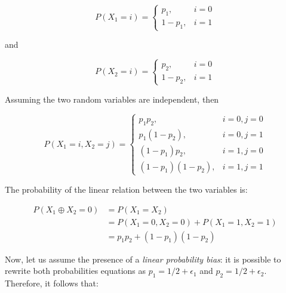             \begin{equation}
                P(X_1 = i) = \left\{\begin{matrix}
                                p_1, & i = 0\\ 
                                1 - p_1, & i = 1 
                             \end{matrix}\right.
            \end{equation}

            \noindent and

            \begin{equation}
                P(X_2 = i) = \left\{\begin{matrix}
                                p_2, & i = 0\\ 
                                1 - p_2, & i = 1 
                             \end{matrix}\right.
            \end{equation}

            \noindent Assuming the two random variables are independent, then

            \begin{equation}
                P(X_1 = i, X_2 = j) = \left\{\begin{matrix}
                                         p_1p_2, & i = 0, j = 0\\ 
                                         p_1(1 - p_2), & i = 0, j = 1\\
                                         (1 - p_1)p_2, & i = 1, j = 0\\
                                         (1 - p_1)(1 - p_2), & i = 1, j = 1
                                      \end{matrix}\right.
            \end{equation}

            \noindent The probability of the linear relation between the two variables is:

            \begin{align*}
                P(X_1 \oplus X_2 = 0)   &= P(X_1 = X_2) \\
                                        &= P(X_1 = 0, X_2 = 0) + P(X_1 = 1, X_2 = 1) \\
                                        &= p_1p_2 + (1-p_1)(1-p_2)
            \end{align*}

            \noindent Now, let us assume the presence of a \emph{linear probability bias}: it is possible to rewrite both probabilities equations as $p_1 = 1/2 + \epsilon_1$ and $p_2 = 1/2 + \epsilon_2$. Therefore, it follows that:

